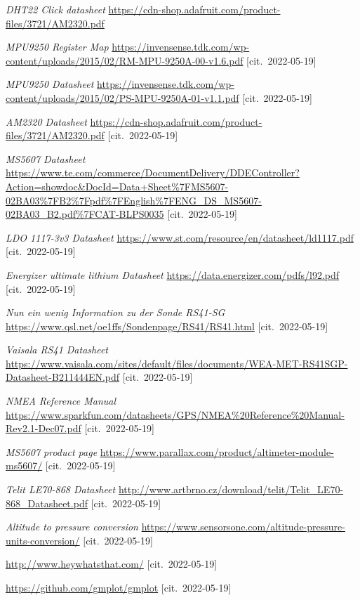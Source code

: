 \documentclass[twoside]{ctuthesis}
\theoremstyle{plain}
\theoremstyle{definition}
\theoremstyle{note}
\begin{document}
\begin{thebibliography}{1}
	\textit{DHT22 Click datasheet}
	\url{https://cdn-shop.adafruit.com/product-files/3721/AM2320.pdf}

	\textit{MPU9250 Register Map}
	\url{https://invensense.tdk.com/wp-content/uploads/2015/02/RM-MPU-9250A-00-v1.6.pdf} [cit.~2022-05-19]

	\textit{MPU9250 Datasheet}
	\url{https://invensense.tdk.com/wp-content/uploads/2015/02/PS-MPU-9250A-01-v1.1.pdf} [cit.~2022-05-19]

	\textit{AM2320 Datasheet}
	\url{https://cdn-shop.adafruit.com/product-files/3721/AM2320.pdf} [cit.~2022-05-19]

	\textit{MS5607 Datasheet}
	\url{https://www.te.com/commerce/DocumentDelivery/DDEController?Action=showdoc&DocId=Data+Sheet%7FMS5607-02BA03%7FB2%7Fpdf%7FEnglish%7FENG_DS_MS5607-02BA03_B2.pdf%7FCAT-BLPS0035} [cit.~2022-05-19]

	\textit{LDO 1117-3v3 Datasheet}
	\url{https://www.st.com/resource/en/datasheet/ld1117.pdf} [cit.~2022-05-19]

	\textit{Energizer ultimate lithium Datasheet}
	\url{https://data.energizer.com/pdfs/l92.pdf} [cit.~2022-05-19]

	\textit{Nun ein wenig Information zu der Sonde RS41-SG}
	\url{https://www.qsl.net/oe1ffs/Sondenpage/RS41/RS41.html} [cit.~2022-05-19]

	\textit{Vaisala RS41 Datasheet}
	\url{https://www.vaisala.com/sites/default/files/documents/WEA-MET-RS41SGP-Datasheet-B211444EN.pdf} [cit.~2022-05-19]

	\textit{NMEA Reference Manual}
	\url{https://www.sparkfun.com/datasheets/GPS/NMEA%20Reference%20Manual-Rev2.1-Dec07.pdf} [cit.~2022-05-19]


	\textit{MS5607 product page}
	\url{https://www.parallax.com/product/altimeter-module-ms5607/} [cit.~2022-05-19]

	\textit{Telit LE70-868 Datasheet}
	\url{http://www.artbrno.cz/download/telit/Telit_LE70-868_Datasheet.pdf} [cit.~2022-05-19]

	\textit{Altitude to pressure conversion}
	\url{https://www.sensorsone.com/altitude-pressure-units-conversion/} [cit.~2022-05-19]

	\url{http://www.heywhatsthat.com/} [cit.~2022-05-19]

	 \url{https://github.com/gmplot/gmplot} [cit.~2022-05-19]




\end{thebibliography}
\end{document}
